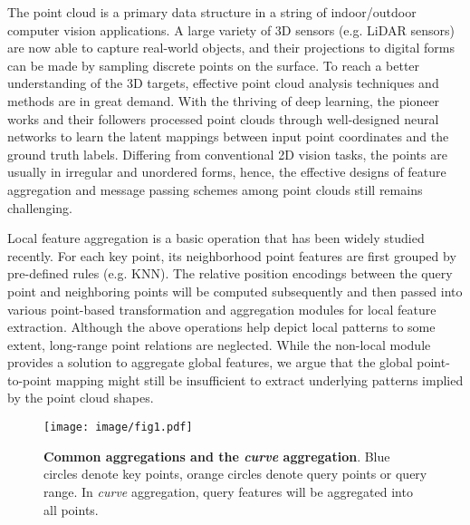 \documentclass[10pt,twocolumn,letterpaper]{article}
\theoremstyle{definition}
\begin{document}
The point cloud is a primary data structure in a string of indoor/outdoor computer vision applications. A large variety of 3D sensors (e.g. LiDAR sensors) are now able to capture real-world objects, and their projections to digital forms can be made by sampling discrete points on the surface. To reach a better understanding of the 3D targets, effective point cloud analysis techniques and methods are in great demand. With the thriving of deep learning, the pioneer works \cite{qi2017pointnet,qi2017pointnet++} and their followers \cite{liu2020closer,hu2020randla,yan2020pointasnl, bytyqi2020local,xu2020grid,hu2020jsenet,lin2020point2skeleton,SGGpoint} processed point clouds through well-designed neural networks to learn the latent mappings between input point coordinates and the ground truth labels. Differing from conventional 2D vision tasks, the points are usually in irregular and unordered forms, hence, the effective designs of feature aggregation and message passing schemes among point clouds still remains challenging.

Local feature aggregation is a basic operation that has been widely studied recently. For each key point, its neighborhood point features are first grouped by pre-defined rules (e.g. KNN). The relative position encodings between the query point and neighboring points will be computed subsequently and then passed into various point-based transformation and aggregation modules for local feature extraction. Although the above operations help depict local patterns to some extent, long-range point relations are neglected. While the non-local module \cite{wang2018non} provides a solution to aggregate global features, we argue that the global point-to-point mapping might still be insufficient to extract underlying patterns implied by the point cloud shapes. 



\begin{figure}
	\begin{center}
\texttt{[image: image/fig1.pdf]}
	\end{center}
	\caption{\textbf{Common aggregations and the \textit{curve} aggregation}. Blue circles denote key points, orange circles denote query points or query range. In \textit{curve} aggregation, query features will be aggregated into all points.}
	\label{fig:1}
\end{figure}
\end{document}
